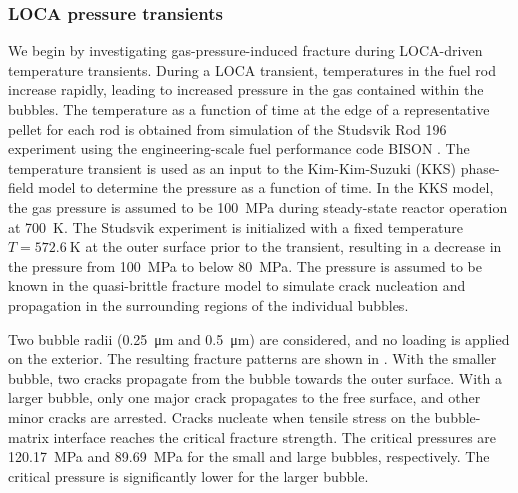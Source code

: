 \subsubsection{LOCA pressure transients}

We begin by investigating gas-pressure-induced fracture during LOCA-driven temperature transients. During a LOCA transient, temperatures in the fuel rod increase rapidly, leading to increased pressure in the gas contained within the bubbles. The temperature as a function of time at the edge of a representative pellet for each rod is obtained from simulation of the Studsvik Rod 196 experiment \cite{STUDSVIK} using the engineering-scale fuel performance code BISON \cite{WILLIAMSON2020}. The temperature transient is used as an input to the Kim-Kim-Suzuki (KKS) phase-field model \cite{Aagesen2020} to determine the pressure as a function of time. In the KKS model, the gas pressure is assumed to be \SI{100}{\mega\pascal} during steady-state reactor operation at \SI{700}{\kelvin}. The Studsvik experiment is initialized with a fixed temperature $T = \SI{572.6}{\kelvin}$ at the outer surface prior to the transient, resulting in a decrease in the pressure from \SI{100}{\mega\pascal} to below \SI{80}{\mega\pascal}. The pressure is assumed to be known in the quasi-brittle fracture model to simulate crack nucleation and propagation in the surrounding regions of the individual bubbles.

Two bubble radii (\SI{0.25}{\micro\meter} and \SI{0.5}{\micro\meter}) are considered, and no loading is applied on the exterior. The resulting fracture patterns are shown in . With the smaller bubble, two cracks propagate from the bubble towards the outer surface. With a larger bubble, only one major crack propagates to the free surface, and other minor cracks are arrested. Cracks nucleate when tensile stress on the bubble-matrix interface reaches the critical fracture strength. The critical pressures are \SI{120.17}{\mega\pascal} and \SI{89.69}{\mega\pascal} for the small and large bubbles, respectively. The critical pressure is significantly lower for the larger bubble.

